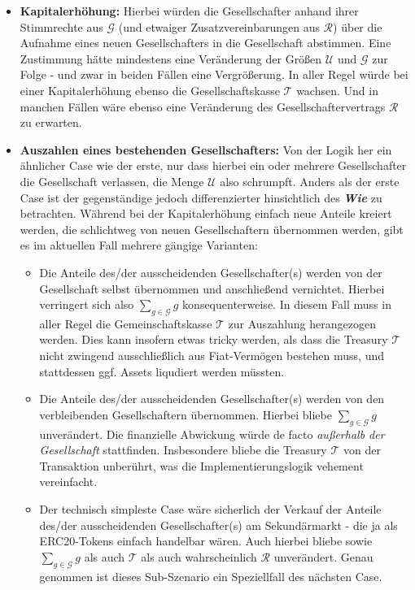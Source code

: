 \begin{Fazit}
\begin{itemize}
  \item \textbf{Kapitalerhöhung:} Hierbei würden die Gesellschafter anhand ihrer Stimmrechte aus $\mathcal{G}$ (und etwaiger Zusatzvereinbarungen aus $\mathcal{R}$) über die Aufnahme eines neuen Gesellschafters in die Gesellschaft abstimmen. Eine Zustimmung hätte mindestens eine Veränderung der Größen $\mathcal{U}$ und $\mathcal{G}$ zur Folge - und zwar in beiden Fällen eine Vergrößerung. In aller Regel würde bei einer Kapital\-erhöhung ebenso die Gesellschaftskasse $\mathcal{T}$ wachsen. Und in manchen Fällen wäre ebenso eine Veränderung des Gesellschaftervertrags $\mathcal{R}$ zu erwarten.
  \item \textbf{Auszahlen eines bestehenden Gesellschafters:} Von der Logik her ein ähnlicher Case wie der erste, nur dass hierbei ein oder mehrere Gesellschafter die Gesellschaft verlassen, die Menge $\mathcal{U}$ also schrumpft. Anders als der erste Case ist der gegenständige jedoch differenzierter hinsichtlich des \textit{\textbf{Wie}} zu betrachten. Während bei der Kapitalerhöhung einfach neue Anteile kreiert werden, die schlichtweg von neuen Gesellschaftern übernommen werden, gibt es im aktuellen Fall mehrere gängige Varianten:
  \begin{itemize}
	\item Die Anteile des/der ausscheidenden Gesellschafter(s) werden von der Gesell\-schaft selbst übernommen und anschließend vernichtet. Hierbei verringert sich also $\sum_{g \in \mathcal{G}}g$ konsequenterweise. In diesem Fall muss in aller Regel die Gemeinschaftskasse $\mathcal{T}$ zur Auszahlung herangezogen werden. Dies kann insofern etwas tricky werden, als dass die Treasury $\mathcal{T}$ nicht zwingend ausschließlich aus Fiat-Vermögen bestehen muss, und stattdessen ggf. Assets liqudiert werden müssten.
	\item Die Anteile des/der ausscheidenden Gesellschafter(s) werden von den verbleibenden Gesellschaftern übernommen. Hierbei bliebe $\sum_{g \in \mathcal{G}}g$ unverändert. Die finanzielle Abwickung würde de facto \textit{außerhalb der Gesell\-schaft} stattfinden. Insbesondere bliebe die Treasury $\mathcal{T}$ von der Transaktion unberührt, was die Implementierungslogik vehement vereinfacht.
	\item Der technisch simpleste Case wäre sicherlich der Verkauf der Anteile des/der ausscheidenden Gesellschafter(s) am Sekundärmarkt - die ja als ERC20-Tokens einfach handelbar wären. Auch hierbei bliebe sowie $\sum_{g \in \mathcal{G}}g$ als auch $\mathcal{T}$ als auch wahrscheinlich $\mathcal{R}$ unverändert. Genau genommen ist dieses Sub-Szenario ein Speziellfall des nächsten Case.

\end{itemize}
\end{itemize}
\end{Fazit}

